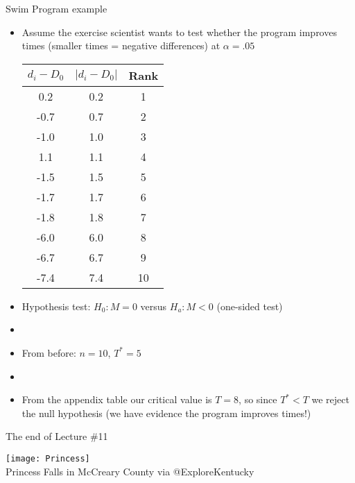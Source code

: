 \documentclass[xcolor=dvipsnames]{beamer}
\begin{document}
\begin{frame}{Swim Program example}
	\begin{itemize}
		\item Assume the exercise scientist wants to test whether the program improves times (smaller times = negative differences) at $\alpha = .05$
		{\tiny
			\begin{center}
				\begin{tabular}{|c|c|c|}
					\hline
					$d_i -D_0$ & \textbf{$|d_i - D_0|$} &  \textbf{Rank}  \\ \hline \hline
					0.2 & 0.2 &     1\\ \hline
					-0.7  &0.7  &    2\\ \hline
					-1.0  &1.0  &    3\\ \hline
					1.1  & 1.1  &    4\\ \hline
					-1.5  & 1.5  &    5\\ \hline
					-1.7  &1.7  &    6\\ \hline
					-1.8  & 1.8  &    7\\ \hline
					-6.0  & 6.0  &    8\\ \hline
					-6.7  & 6.7  &    9\\ \hline
					-7.4  &7.4  &   10\\ \hline
				\end{tabular}
		\end{center}}
	\item Hypothesis test: $H_0: M = 0$ versus  $H_a: M < 0$ (one-sided test)
	\item[]
	\item From before: $n = 10$, $T^* = 5$
	\item[] 
	\item From the appendix table our critical value is $T = 8$, so since $T^* < T$ we reject the null hypothesis (we have evidence the program improves times!)
	\end{itemize}
\end{frame}

\begin{frame}{The end of Lecture \#11}
	\begin{center}
		\texttt{[image: Princess]} \\
		{\tiny Princess Falls in McCreary County via @ExploreKentucky}
	\end{center}
\end{frame}
\end{document}

